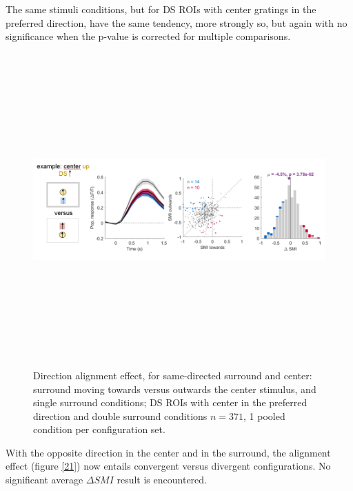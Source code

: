 The same stimuli conditions, but for DS ROIs with center gratings in the preferred direction, have the same tendency, more strongly so, but again with no significance when the p-value is corrected for multiple comparisons.

\begin{figure}[H] \centering \includegraphics[width=12cm,height=12cm,keepaspectratio]{Figures/7.Results/finalPopulation/sel/diagrams/20.png} 
\caption{Direction alignment effect, for same-directed surround and center: surround moving towards versus outwards the center stimulus, and single surround conditions; DS ROIs with center in the preferred direction and double surround conditions $n=371$, 1 pooled condition per configuration set.} \label{20}
\end{figure}

With the opposite direction in the center and in the surround, the alignment effect (figure \ref{21}) now entails convergent versus divergent configurations. No significant average $\Delta SMI$ result is encountered.


